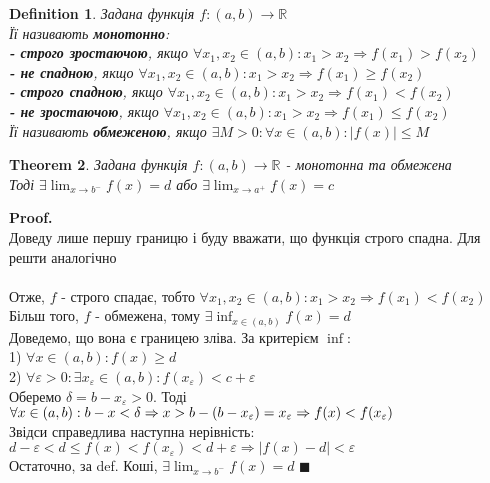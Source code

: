 \documentclass[a4paper, 14pt]{extarticle}
\def\huge{\displaystyle}
\def\bigline{\vspace{5mm}\\}
\theoremstyle{theoremdd}
\newtheorem{theorem}{Theorem}[subsection]
\theoremstyle{theoremdd}
\newtheorem{definition}[theorem]{Definition}
\theoremstyle{theoremdd}
\theoremstyle{theoremdd}
\theoremstyle{theoremdd}
\theoremstyle{theoremdd}
\theoremstyle{theoremdd}
\theoremstyle{theoremdd}
\newenvironment{pf}{\vspace*{-3mm} \textbf{Proof. \\}}{$\blacksquare$}
\begin{document}
\begin{definition}
Задана функція $f: (a,b) \to \mathbb{R}$\\
Її називають \textbf{монотонно}:\\
\textbf{- строго зростаючою}, якщо $\forall x_1,x_2 \in (a,b): x_1 > x_2 \Rightarrow f(x_1)>f(x_2)$\\
\textbf{- не спадною}, якщо $\forall x_1,x_2 \in (a,b): x_1 > x_2 \Rightarrow f(x_1) \geq f(x_2)$\\
\textbf{- строго спадною}, якщо $\forall x_1,x_2 \in (a,b): x_1 > x_2 \Rightarrow f(x_1) < f(x_2)$\\
\textbf{- не зростаючою}, якщо $\forall x_1,x_2 \in (a,b): x_1 > x_2 \Rightarrow f(x_1) \leq f(x_2)$
\bigline
Її називають \textbf{обмеженою}, якщо $\exists M>0: \forall x \in (a,b): |f(x)| \leq M$
\end{definition}

\begin{theorem}
Задана функція $f: (a,b) \to \mathbb{R}$ - монотонна та обмежена\\
Тоді $\huge \exists \lim_{x \to b^-} f(x) = d$ або $\huge \exists \lim_{x \to a^+} f(x) = c$
\end{theorem}

\begin{pf}
Доведу лише першу границю і буду вважати, що функція строго спадна. Для решти аналогічно\\
\\
Отже, $f$ - строго спадає, тобто $\forall x_1,x_2 \in (a,b): x_1>x_2 \Rightarrow f(x_1)<f(x_2)$\\
Більш того, $f$ - обмежена, тому $\exists \huge \inf_{x \in (a,b)} f(x) = d$\\
Доведемо, що вона є границею зліва. За критерієм $\inf$:\\
1) $\forall x \in (a,b): f(x) \geq d$\\
2) $\forall \varepsilon > 0: \exists x_{\varepsilon} \in (a,b): f(x_{\varepsilon})<c + \varepsilon$\\
Оберемо $\delta = b - x_{\varepsilon} > 0$. Тоді $\forall x \in (a,b): b-x<\delta \Rightarrow \\ x > b - (b-x_{\varepsilon}) = x_{\varepsilon} \Rightarrow f(x) < f(x_\varepsilon)$\\
Звідси справедлива наступна нерівність:\\
$d - \varepsilon < d \leq f(x) < f(x_\varepsilon) < d + \varepsilon \Rightarrow |f(x)-d| < \varepsilon$\\
Остаточно, за def. Коші, $\exists \huge \lim_{x \to b^-} f(x) =  d$
\end{pf}
\end{document}
